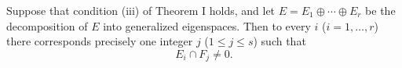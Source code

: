 Suppose that condition (iii) of Theorem I holds, and let $E = E_1 \oplus \cdots \oplus E_r$ be the decomposition of $E$ into generalized eigenspaces. Then to every $i$ ($i=1,\ldots,r$) there corresponds precisely one integer $j$ ($1 \leq j \leq s$) such that
$$E_i \cap F_j \neq 0.$$
